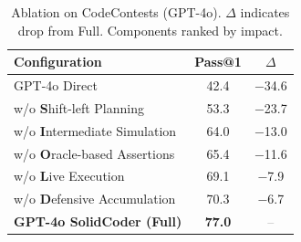 \documentclass[11pt]{article}
\begin{document}
\begin{table}[t]
    \centering
    \small
    \begin{tabular}{@{}lcc@{}}
        \toprule
        \textbf{Configuration} & \textbf{Pass@1} & \textbf{$\Delta$} \\
        \midrule
        GPT-4o Direct  & 42.4 & \textcolor{CrossRed}{$-$34.6} \\
        \addlinespace[3pt]
        \quad w/o \textbf{S}hift-left Planning & 53.3 & \textcolor{CrossRed}{$-$23.7} \\
        \quad w/o \textbf{I}ntermediate Simulation & 64.0 & \textcolor{CrossRed}{$-$13.0} \\
        \quad w/o \textbf{O}racle-based Assertions & 65.4 & \textcolor{CrossRed}{$-$11.6} \\
        \quad w/o \textbf{L}ive Execution & 69.1 & \textcolor{CrossRed}{$-$7.9} \\
        \quad w/o \textbf{D}efensive Accumulation & 70.3 & \textcolor{CrossRed}{$-$6.7} \\
        \midrule
        \textbf{GPT-4o SolidCoder (Full)} & \textbf{77.0} & \textcolor{gray}{--} \\
        \bottomrule
    \end{tabular}
    \caption{Ablation on CodeContests (GPT-4o). $\Delta$ indicates drop from Full. Components ranked by impact.}
    \label{tab:ablation}
\end{table}
\end{document}
